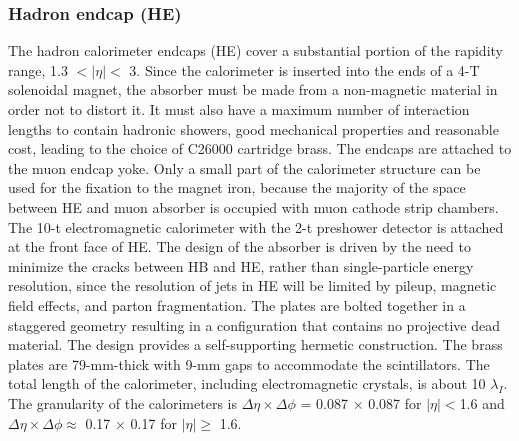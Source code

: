 \subsubsection{Hadron endcap (HE)}
The hadron calorimeter endcaps (HE) cover a substantial portion of the rapidity range, 1.3 $<|\eta|<$ 3. Since the calorimeter is inserted into the ends of a 4-T solenoidal magnet, the absorber must be made from a non-magnetic material in order not to distort it. It must also have a maximum number of interaction lengths to contain hadronic showers, good mechanical properties and reasonable cost, leading to the choice of C26000 cartridge brass. The endcaps are attached to the muon endcap yoke. Only a small part of the calorimeter structure can be used for the fixation to the magnet iron, because the majority of the space between HE and muon absorber is occupied with muon cathode strip chambers. The 10-t electromagnetic calorimeter with the 2-t preshower detector is attached at the front face of HE. The design of the absorber is driven by the need to minimize the cracks between HB and HE, rather than single-particle energy resolution, since the resolution of jets in HE will be limited by pileup, magnetic field effects, and parton fragmentation. The plates are bolted together in a staggered geometry resulting in a configuration that contains no projective dead material. The design provides a self-supporting hermetic construction. The brass plates are 79-mm-thick with 9-mm gaps to accommodate the scintillators. The total length of the calorimeter, including electromagnetic crystals, is about 10 $\lambda_{I}$. The granularity of the calorimeters is $\Delta \eta  \times \Delta \phi$ = 0.087 $\times$ 0.087 for $|\eta|<$1.6 and $\Delta \eta \times \Delta \phi \approx$ 0.17 $ \times $ 0.17 for $|\eta| \ge$ 1.6.

